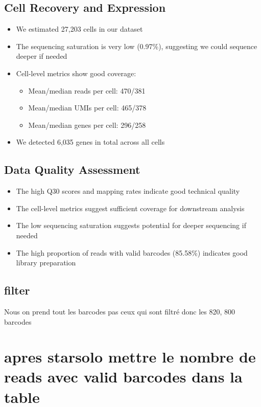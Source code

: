 \documentclass[
  11pt,
  a4paper,
]{report}
\providecommand{\tightlist}{%
  \setlength{\itemsep}{0pt}\setlength{\parskip}{0pt}}\usepackage{longtable,booktabs,array}
\begin{document}
\subsection{Cell Recovery and
Expression}\label{cell-recovery-and-expression}

\begin{itemize}
\tightlist
\item
  We estimated 27,203 cells in our dataset
\item
  The sequencing saturation is very low (0.97\%), suggesting we could
  sequence deeper if needed
\item
  Cell-level metrics show good coverage:

  \begin{itemize}
  \tightlist
  \item
    Mean/median reads per cell: 470/381
  \item
    Mean/median UMIs per cell: 465/378
  \item
    Mean/median genes per cell: 296/258
  \end{itemize}
\item
  We detected 6,035 genes in total across all cells
\end{itemize}

\subsection{Data Quality Assessment}\label{data-quality-assessment}

\begin{itemize}
\tightlist
\item
  The high Q30 scores and mapping rates indicate good technical quality
\item
  The cell-level metrics suggest sufficient coverage for downstream
  analysis
\item
  The low sequencing saturation suggests potential for deeper sequencing
  if needed
\item
  The high proportion of reads with valid barcodes (85.58\%) indicates
  good library preparation
\end{itemize}

\subsection{filter}\label{filter}

Nous on prend tout les barcodes pas ceux qui sont filtré donc les 820,
800 barcodes

\section{apres starsolo mettre le nombre de reads avec valid barcodes
dans la
table}\label{apres-starsolo-mettre-le-nombre-de-reads-avec-valid-barcodes-dans-la-table}
\end{document}
